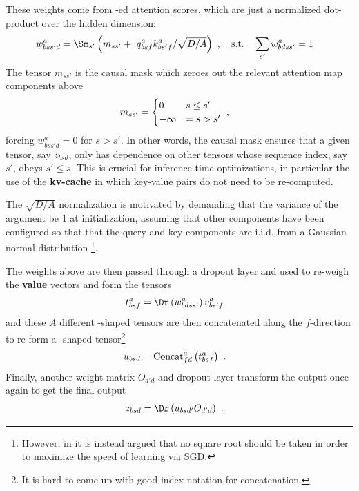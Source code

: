 \documentclass[11pt]{article}
\begin{document}
 These weights come from -ed attention scores, which are just a normalized
 dot-product over the hidden dimension:
\begin{align}
    w ^{ a }_{ bss'd } &=\Sm _{ s' } \left (m _{ s s' }+\ q ^{ a }_{ bsf }k ^{ a }_{ bs'f } / \sqrt{D/A} \right
        )\ ,  \quad {\rm s.t.} \quad \sum_{s'}w ^{ a }_{ bdss' } =1
\end{align}
The tensor $ m _{  s s' } $ is the causal mask which zeroes out the relevant attention map
components above
\begin{align}
    m _{ s s' } &= \begin{cases}
            0 & s \le s' \nonumber\\
            -\infty &= s > s'
        \end{cases}\ ,
\end{align}
forcing $ w ^{ a  } _{ bss'd } =0$ for $ s> s' $. In other words, the causal mask ensures that a
given tensor, say $ z _{ bsd } $, only has dependence on other tensors whose sequence index, say $
s' $, obeys $ s' \le s $.  This is crucial for inference-time optimizations, in particular the use
of the \textbf{kv-cache} in which key-value pairs do not need to be re-computed.

The $ \sqrt{D/A} $ normalization is motivated by demanding
that the variance of the  argument be 1 at initialization, assuming that other
components have been configured so that that the query and key components are i.i.d. from a Gaussian
normal distribution \footnote{However, in \cite{yang2022tensor} it is instead argued that no square
root should be taken in order to maximize the speed of learning via SGD.}.

The weights above are then passed through a dropout layer and used to re-weigh the \textbf{value} vectors and form the tensors
\begin{align}
  t ^{ a }_{ bsf }&=\Dr  \left (w ^{ a }_{ bdss' } \right ) v ^{ a }_{ bs'f }
  \label{eq_reweighted_values}
\end{align}
and these $ A $ different -shaped tensors
are then concatenated along the $ f $-direction to re-form a -shaped
tensor\footnote{It is hard to come up with good index-notation for concatenation.}
\begin{align}
    u _{ bsd } &= {\rm Concat}^{ a }_{ fd } \left ( t ^{ a }_{ bsf }\right )\ .
\end{align}
Finally, another weight matrix $ O _{d' d } $ and dropout layer transform the output once again to get the final
output
\begin{align}
  z _{ bsd } &= \Dr \left (u  _{ bsd' } O _{ d'd }\right )\ .
\end{align}
\end{document}
